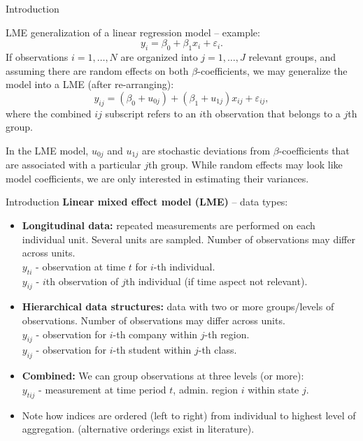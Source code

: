 \documentclass{beamer}
\begin{document}
\begin{frame}{Introduction}

LME generalization of a linear regression model -- example: 
$$y_i = \beta_0 + \beta_1 x_i + \varepsilon_i.$$ 
If observations $i=1,\dots,N$ are organized into $j=1,\dots,J$ relevant groups, and assuming there are random effects on both $\beta$-coefficients, we may generalize the model into a LME (after re-arranging):
$$y_{ij} = (\beta_0 + u_{0j}) + (\beta_1 + u_{1j}) x_{ij} + \varepsilon_{ij},$$
where the combined $ij$ subscript refers to an $i$th observation that belongs to a $j$th group. 

\medskip
In the LME model, $u_{0j}$ and $u_{1j}$ are stochastic deviations from $\beta$-coefficients that are associated with a particular $j$th group. While random effects may look like model coefficients, we are only interested in estimating their variances. 
\end{frame}
\begin{frame}{Introduction}
\small 
\textbf{Linear mixed effect model (LME)} -- data types:
\medskip
\begin{itemize}
\item \textbf{Longitudinal data:} repeated measurements are performed on each individual  unit. Several units are sampled. Number of observations may differ across units.\\ \smallskip
\quad $y_{ti}$ - observation at time $t$ for $i$-th individual. \\  
\quad $y_{ij}$ - $i$th observation of $j$th individual (if time aspect not relevant). \\ 
\bigskip
\item \textbf{Hierarchical data structures:} data with two or more groups/levels of observations. Number of observations may differ across units.\\ \smallskip
\quad $y_{ij}$ - observation for $i$-th company within $j$-th region. \\ 
\quad $y_{ij}$ - observation for $i$-th student within $j$-th class. \\ 
\medskip
\bigskip
\item \textbf{Combined:} We can group observations at three levels (or more):\\
\smallskip
\quad $y_{tij}$ - measurement at time period $t$, admin. region $i$ within state $j$.\\ 
\bigskip
\item Note how indices are ordered (left to right) from individual to highest level of aggregation. (alternative orderings exist in literature).
\end{itemize}
\end{frame}
\end{document}
